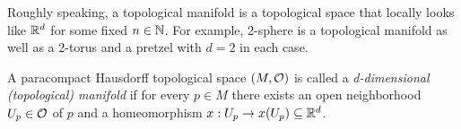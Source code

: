 
Roughly speaking, a topological manifold is a topological space that locally looks like \(\mathbb R^d\) for some fixed \(n \in \mathbb N\). For example, 2-sphere is a topological manifold as well as a 2-torus and a pretzel with \(d = 2\) in each case.

\begin{definition}
	A paracompact Hausdorff topological space \((M, \mathcal{O})\) is called a \emph{d-dimensional (topological) manifold} if for every \(p \in M\) there exists an open neighborhood \(U_p \in \mathcal{O}\) of \(p\) and a homeomorphism \(x: U_p \to x(U_p) \subseteq \mathbb R^d\).
\end{definition}
